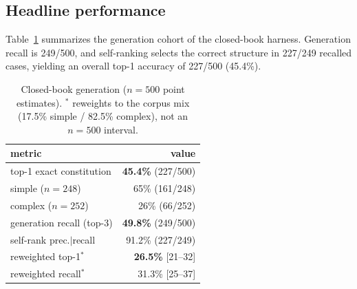 \documentclass{article}
\begin{document}
\subsection{Headline performance}
\label{sec:headline}

Table~\ref{tab:headline} summarizes the generation cohort of the closed-book harness. Generation recall is 249/500, and self-ranking selects the correct structure in 227/249 recalled cases, yielding an overall top-1 accuracy of 227/500 (45.4\%).

\begin{table}
\vspace{-1.2\baselineskip}
\centering
\caption{\footnotesize Closed-book generation ($n{=}500$ point estimates). $^{\ast}$ reweights to the corpus mix (17.5\% simple / 82.5\% complex), not an $n{=}500$ interval.}\label{tab:headline}
\small
\setlength{\tabcolsep}{4pt}
\begin{tabular}{@{}lr@{}}
\toprule
metric & value \\
\midrule
top-1 exact constitution & \textbf{45.4\%} (227/500) \\
\quad simple ($n{=}248$) & 65\% (161/248) \\
\quad complex ($n{=}252$) & 26\% (66/252) \\
generation recall (top-3) & \textbf{49.8\%} (249/500) \\
self-rank prec.$|$recall & 91.2\% (227/249) \\
\midrule
reweighted top-1$^{\ast}$ & \textbf{26.5\%} [21--32] \\
reweighted recall$^{\ast}$ & 31.3\% [25--37] \\
\bottomrule
\end{tabular}
\vspace{-0.5\baselineskip}
\end{table}
\end{document}

